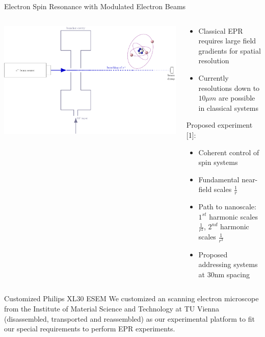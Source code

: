 \documentclass[final]{beamer}
\begin{document}
\begin{frame}[fragile]{}
\begin{columns}[T]
\begin{column}{.49\linewidth}
\begin{block}{\Large Electron Spin Resonance with Modulated Electron Beams}
		\begin{columns}
			\begin{column}{0.45\columnwidth}
				\includegraphics[width=\columnwidth]{./figures/qklystron.pdf}
			\end{column}
			\begin{column}{0.45\columnwidth}
				\begin{itemize}	
					\item Classical EPR requires large field gradients for spatial resolution
					\item Currently resolutions down to $10 \mu m$ are possible in classical systems
				\end{itemize}

				Proposed experiment [1]:

				\begin{itemize}
					\item Coherent control of spin systems
					\item Fundamental near-field scales $\frac{1}{r}$
					\item Path to nanoscale: $1^{st}$ harmonic scales $\frac{1}{r^2}$, $2^{nd}$ harmonic scales $\frac{1}{r^3}$
					\item Proposed addressing systems at 30nm spacing
				\end{itemize}
			\end{column}
		\end{columns}
	\end{block}
	\begin{block}{\Large Customized Philips XL30 ESEM}
		We customized an scanning electron microscope from the Institute of Material Science and Technology at TU Vienna (disassembled, transported and reassembled) as our experimental platform to fit our special requirements to perform EPR experiments.
		\vspace{1cm}


\end{block}
\end{column}
\end{columns}
\end{frame}
\end{document}
